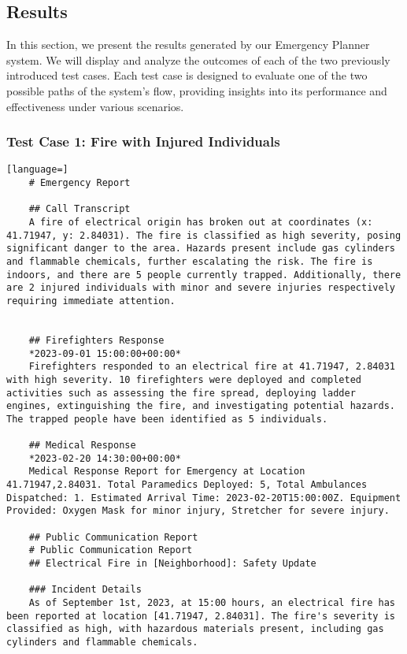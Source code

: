 \subsection{Results}\label{subsec:results}
In this section, we present the results generated by our Emergency Planner system. We will display and analyze the outcomes of each of the two previously introduced test cases. Each test case is designed to evaluate one of the two possible paths of the system's flow, providing insights into its performance and effectiveness under various scenarios.

\subsubsection{Test Case 1: Fire with Injured Individuals}
\begin{lstlisting}[language=]
    # Emergency Report

    ## Call Transcript
    A fire of electrical origin has broken out at coordinates (x: 41.71947, y: 2.84031). The fire is classified as high severity, posing significant danger to the area. Hazards present include gas cylinders and flammable chemicals, further escalating the risk. The fire is indoors, and there are 5 people currently trapped. Additionally, there are 2 injured individuals with minor and severe injuries respectively requiring immediate attention.


    ## Firefighters Response
    *2023-09-01 15:00:00+00:00*
    Firefighters responded to an electrical fire at 41.71947, 2.84031 with high severity. 10 firefighters were deployed and completed activities such as assessing the fire spread, deploying ladder engines, extinguishing the fire, and investigating potential hazards. The trapped people have been identified as 5 individuals.

    ## Medical Response
    *2023-02-20 14:30:00+00:00*
    Medical Response Report for Emergency at Location 41.71947,2.84031. Total Paramedics Deployed: 5, Total Ambulances Dispatched: 1. Estimated Arrival Time: 2023-02-20T15:00:00Z. Equipment Provided: Oxygen Mask for minor injury, Stretcher for severe injury.

    ## Public Communication Report
    # Public Communication Report
    ## Electrical Fire in [Neighborhood]: Safety Update

    ### Incident Details
    As of September 1st, 2023, at 15:00 hours, an electrical fire has been reported at location [41.71947, 2.84031]. The fire's severity is classified as high, with hazardous materials present, including gas cylinders and flammable chemicals.


\end{lstlisting}
